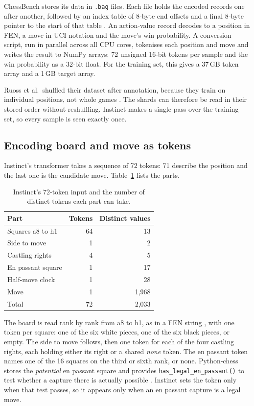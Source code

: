 ChessBench stores its data in \texttt{.bag} files.
Each file holds the encoded records one after another, followed by an index table of 8-byte end offsets and a final 8-byte pointer to the start of that table \cite{GoogleDeepMind2024}.
An action-value record decodes to a position in \ac{FEN}, a move in \ac{UCI} notation and the move's win probability.
A conversion script, run in parallel across all \ac{CPU} cores, tokenises each position and move and writes the result to NumPy arrays: 72 unsigned 16-bit tokens per sample and the win probability as a 32-bit float.
For the training set, this gives a 37\,GB token array and a 1\,GB target array.

Ruoss et al.\ shuffled their dataset after annotation, because they train on individual positions, not whole games \cite{Ruoss2024}.
The shards can therefore be read in their stored order without reshuffling.
Instinct makes a single pass over the training set, so every sample is seen exactly once.

\subsection{Encoding board and move as tokens}
\label{subsec:encoding}

Instinct's transformer takes a sequence of 72 tokens: 71 describe the position and the last one is the candidate move.
Table~\ref{tab:tokens} lists the parts.

\begin{table}[htbp]
  \centering
  \caption{Instinct's 72-token input and the number of distinct tokens each part can take.}
  \label{tab:tokens}
  \begin{tabular}{lrr}
    \toprule
    Part & Tokens & Distinct values \\
    \midrule
    Squares a8 to h1      & 64 & 13 \\
    Side to move          & 1  & 2 \\
    Castling rights       & 4  & 5 \\
    En passant square     & 1  & 17 \\
    Half-move clock       & 1  & 28 \\
    Move                  & 1  & 1,968 \\
    \midrule
    Total                 & 72 & 2,033 \\
    \bottomrule
  \end{tabular}
\end{table}

The board is read rank by rank from a8 to h1, as in a \ac{FEN} string \cite{Ruoss2024}, with one token per square: one of the six white pieces, one of the six black pieces, or empty.
The side to move follows, then one token for each of the four castling rights, each holding either its right or a shared \emph{none} token.
The en passant token names one of the 16 squares on the third or sixth rank, or none.
Python-chess stores the \emph{potential} en passant square and provides \texttt{has\_legal\_en\_passant()} to test whether a capture there is actually possible \cite{pythonchess}.
Instinct sets the token only when that test passes, so it appears only when an en passant capture is a legal move.

